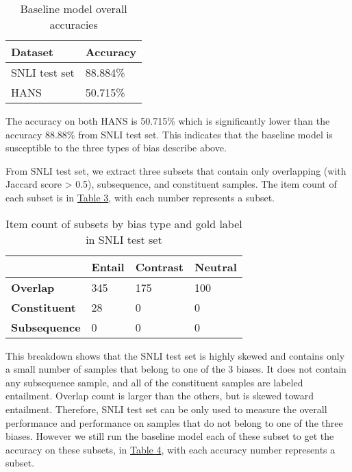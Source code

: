 \documentclass{article}
\begin{document}
\begin{table}[h]
    \label{table2}
    \caption{Baseline model overall accuracies}
    \centering
    \begin{tabular}{l l}
    \hline
    \textbf{Dataset}    & \textbf{Accuracy}    \\ \hline
    SNLI test set  & 88.884\%        \\
    HANS  & 50.715\%        \\ \hline
    \end{tabular}

\end{table}


The accuracy on both HANS is 50.715\% which is significantly lower than the accuracy 88.88\% from SNLI test set.
This indicates that the baseline model is susceptible to the three types of bias describe above.

From SNLI test set, we extract three subsets that contain only overlapping (with Jaccard score > 0.5), subsequence, and constituent samples.
The item count of each subset is in \hyperref[table3]{Table 3}, with each number represents a subset.


\begin{table}[H]
    \caption{Item count of subsets by bias type and gold label in SNLI test set}
\label{table3}
\centering
\begin{tabular}{l l l l}
\hline
\textbf{}            & \textbf{Entail} & \textbf{Contrast} & \textbf{Neutral} \\ \hline
\textbf{Overlap}     & 345    & 175      & 100    \\
\textbf{Constituent} & 28     & 0        & 0      \\
\textbf{Subsequence} & 0      & 0        & 0      \\ \hline
\end{tabular}

\end{table}

This breakdown shows that the SNLI test set is highly skewed and contains only a small number of samples that belong to one of the 3 biases.
It does not contain any subsequence sample, and all of the constituent samples are labeled entailment.
Overlap count is larger than the others, but is skewed toward entailment.
Therefore, SNLI test set can be only used to measure the overall performance and performance on samples that do not belong to one of the three biases.
However we still run the baseline model each of these subset to get the accuracy on these subsets, in \hyperref[table4]{Table 4}, with each accuracy number represents a subset.
\end{document}
